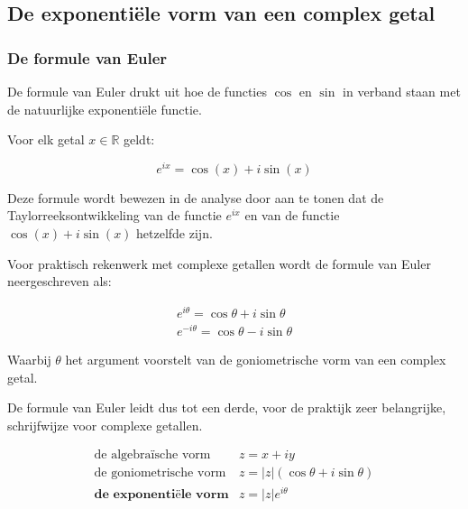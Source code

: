 \subsection{De exponenti\"{e}le vorm van een complex getal}

\subsubsection{De formule van Euler}

De formule van Euler drukt uit hoe de functies $\cos$ en $\sin$ in verband staan met de natuurlijke exponenti\"{e}le functie.\\
\begin{eigenschap}
	Voor elk getal $x \in \mathbb{R}$ geldt:\\

\begin{framed}
	\[ e^{ix}=\cos(x) + i \sin(x) \]
\end{framed}
\end{eigenschap}

Deze formule wordt bewezen in de analyse door aan te tonen dat de Taylorreeksontwikkeling van de functie $e^{ix}$ en van de functie $\cos(x) + i \sin(x)$ hetzelfde zijn. \\

\begin{eigenschap}
	Voor praktisch rekenwerk met complexe getallen wordt de formule van Euler neergeschreven als:\\

\begin{framed}
	\[  \begin{array}{l} 
	e^{i \theta}=\cos \theta +i \sin \theta \\
	e^{-i \theta}=\cos \theta - i \sin \theta 
	\end{array}  \]
\end{framed}
Waarbij $\theta$ het argument voorstelt van de goniometrische vorm van een complex getal. \\
\end{eigenschap}

\begin{eigenschap}
	De formule van Euler leidt dus tot een derde, voor de praktijk zeer belangrijke, schrijfwijze voor complexe getallen.\\

\begin{framed}
	\[ \begin{array}{ll}
	\text{de algebra\"{i}sche vorm} & z=x+iy \\
	\text{de goniometrische vorm} & z=|z|(\cos \theta +i \sin \theta) \\
	\textbf{de exponenti\"{e}le vorm} & z=|z|e^{i \theta} \end{array}  \]
\end{framed}

\end{eigenschap}

